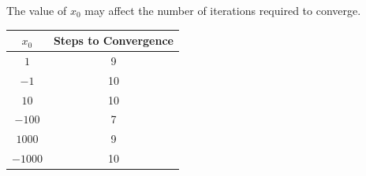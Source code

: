\begin{remark}
    The value of \( x_0 \) may affect the number of iterations required to converge.

    \begin{table}[H]
        \centering
        \begin{tabular}{c|c}
            \( x_0 \)   & Steps to Convergence
            \\ \hline
            \( 1 \)     & 9
            \\
            \( -1 \)    & 10
            \\
            \( 10 \)    & 10
            \\
            \( -100 \)  & 7
            \\
            \( 1000 \)  & 9
            \\
            \( -1000 \) & 10
        \end{tabular}
    \end{table}
\end{remark}


